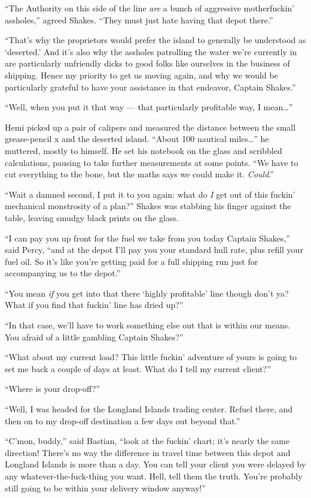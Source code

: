 \documentclass[
]{scrbook}
\begin{document}
``The Authority on this side of the line \emph{are} a bunch of
aggressive motherfuckin' assholes,'' agreed Shakes. ``They must just
hate having that depot there.''

``That's why the proprietors would prefer the island to generally be
understood as `deserted.' And it's also why the assholes patrolling the
water we're currently in are particularly unfriendly dicks to good folks
like ourselves in the business of shipping. Hence my priority to get us
moving again, and why we would be particularly grateful to have your
assistance in that endeavor, Captain Shakes.''

``Well, when you put it that way --- that particularly profitable way, I
mean\ldots{}''

Hemi picked up a pair of calipers and measured the distance between the
small grease-pencil x and the deserted island. ``About 100 nautical
miles\ldots{}'' he muttered, mostly to himself. He set his notebook on
the glass and scribbled calculations, pausing to take further
measurements at some points. ``We have to cut everything to the bone,
but the maths says we could make it. \emph{Could}.''

``Wait a damned second, I put it to you again: what do \emph{I} get out
of this fuckin' mechanical monstrosity of a plan?'' Shakes was stabbing
his finger against the table, leaving smudgy black prints on the glass.

``I can pay you up front for the fuel we take from you today Captain
Shakes,'' said Percy, ``and at the depot I'll pay you your standard hull
rate, plus refill your fuel oil. So it's like you're getting paid for a
full shipping run just for accompanying us to the depot.''

``You mean \emph{if} you get into that there `highly profitable' line
though don't ya? What if you find that fuckin' line has dried up?''

``In that case, we'll have to work something else out that is within our
means. You afraid of a little gambling Captain Shakes?''

``What about my current load? This little fuckin' adventure of yours is
going to set me back a couple of days at least. What do I tell my
current client?''

``Where is your drop-off?''

``Well, I was headed for the Longland Islands trading center. Refuel
there, and then on to my drop-off destination a few days out beyond
that.''

``C'mon, buddy,'' said Bastian, ``look at the fuckin' chart; it's nearly
the same direction! There's no way the difference in travel time between
this depot and Longland Islands is more than a day. You can tell your
client you were delayed by any whatever-the-fuck-thing you want. Hell,
tell them the truth. You're probably still going to be within your
delivery window anyway!''
\end{document}

